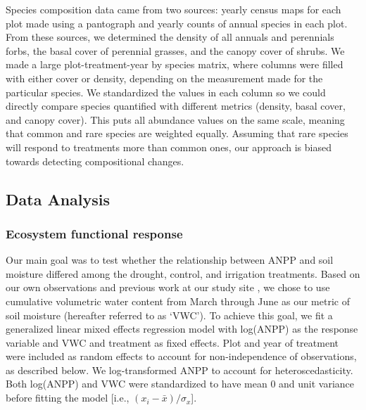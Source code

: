 \documentclass[fleqn,10pt,lineno]{wlpeerj} %
\begin{document}
Species composition data came from two sources: yearly census maps for
each plot made using a pantograph \citep{Hill1920} and yearly counts of
annual species in each plot. From these sources, we determined the
density of all annuals and perennials forbs, the basal cover of
perennial grasses, and the canopy cover of shrubs. We made a large
plot-treatment-year by species matrix, where columns were filled with
either cover or density, depending on the measurement made for the
particular species. We standardized the values in each column so we
could directly compare species quantified with different metrics
(density, basal cover, and canopy cover). This puts all abundance values
on the same scale, meaning that common and rare species are weighted
equally. Assuming that rare species will respond to treatments more than
common ones, our approach is biased towards detecting compositional
changes.

\subsection{Data Analysis}\label{data-analysis}

\subsubsection{Ecosystem functional
response}\label{ecosystem-functional-response}

Our main goal was to test whether the relationship between ANPP and soil
moisture differed among the drought, control, and irrigation treatments.
Based on our own observations and previous work at our study site
\citep{Blaisdell1958, Dalgleish2011, Adler2012}, we chose to use
cumulative volumetric water content from March through June as our
metric of soil moisture (hereafter referred to as `VWC'). To achieve
this goal, we fit a generalized linear mixed effects regression model
with log(ANPP) as the response variable and VWC and treatment as fixed
effects. Plot and year of treatment were included as random effects to
account for non-independence of observations, as described below. We
log-transformed ANPP to account for heteroscedasticity. Both log(ANPP)
and VWC were standardized to have mean 0 and unit variance before
fitting the model {[}i.e., \((x_i - \bar{x})/\sigma_x\){]}.
\end{document}
